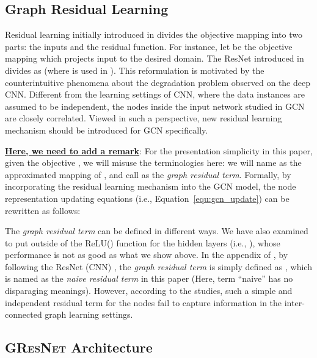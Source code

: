 \documentclass{article}
\newcommand{\gresnet}{\textsc{GResNet}}
\newcommand{\gcn}{\textsc{GCN}}
\begin{document}
\vspace{-8pt}
\subsection{Graph Residual Learning}
\vspace{-8pt}

Residual learning initially introduced in \cite{HZRS15} divides the objective mapping into two parts: the inputs and the residual function. For instance, let  be the objective mapping which projects input  to the desired domain. The ResNet introduced in \cite{HZRS15} divides  as  (where  is used in \cite{HZRS15}). This reformulation is motivated by the counterintuitive phenomena about the degradation problem observed on the deep CNN. Different from the learning settings of CNN, where the data instances are assumed to be independent, the nodes inside the input network studied in {\gcn} are closely correlated. Viewed in such a perspective, new residual learning mechanism should be introduced for {\gcn} specifically. 

\underline{\textbf{Here, we need to add a remark}}: For the presentation simplicity in this paper, given the objective  , we will misuse the terminologies here: we will name  as the approximated mapping of , and call  as the \textit{graph residual term}. Formally, by incorporating the {residual learning} mechanism into the {\gcn} model, the node representation updating equations (i.e., Equation~\ref{equ:gcn_update}) can be rewritten as follows:


The \textit{graph residual term}  can be defined in different ways. We have also examined to put  outside of the ReLU() function for the hidden layers (i.e., ), whose performance is not as good as what we show above. In the appendix of \cite{KW16}, by following the ResNet (CNN) \cite{HZRS15}, the \textit{graph residual term}  is simply defined as , which is named as the \textit{naive residual term} in this paper (Here, term ``naive'' has no disparaging meanings). However, according to the studies, such a simple and independent residual term for the nodes fail to capture information in the inter-connected graph learning settings.

\vspace{-8pt}
\subsection{{\gresnet} Architecture}
\vspace{-8pt}
\end{document}
